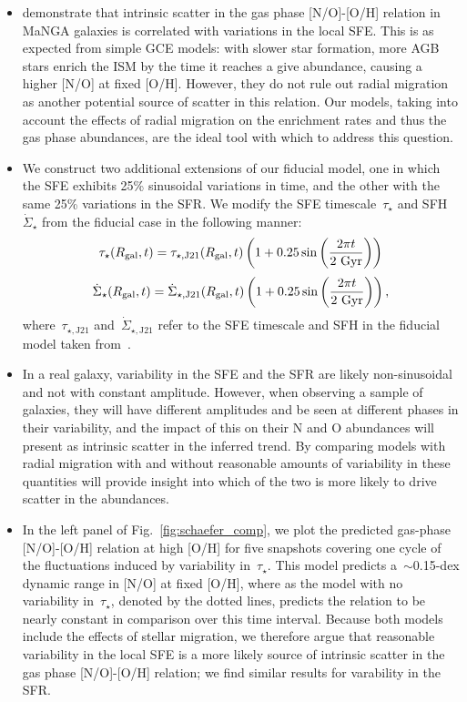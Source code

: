 \documentclass[ms.tex]{subfiles}
\begin{document}
\begin{itemize} 
	\item \citet{Schaefer2020} demonstrate that intrinsic scatter in the gas 
	phase [N/O]-[O/H] relation in MaNGA galaxies is correlated with variations 
	in the local SFE. 
	This is as expected from simple GCE models: with slower star formation, 
	more AGB stars enrich the ISM by the time it reaches a give abundance, 
	causing a higher [N/O] at fixed [O/H]. 
	However, they do not rule out radial migration as another potential source 
	of scatter in this relation. 
	Our models, taking into account the effects of radial migration on the 
	enrichment rates and thus the gas phase abundances, are the ideal tool 
	with which to address this question. 

	\item We construct two additional extensions of our fiducial model, one 
	in which the SFE exhibits 25\% sinusoidal variations in time, and the other 
	with the same 25\% variations in the SFR. 
	We modify the SFE timescale~$\tau_\star$ and SFH~$\dot{\Sigma}_\star$ from 
	the fiducial case in the following manner: 
	\begin{equation} 
	\tau_\star(R_\text{gal}, t) = \tau_{\star,\text{J21}}(R_\text{gal}, t)\left(1 + 0.25\sin 
	\left(\frac{2\pi t}{2\text{ Gyr}}\right)\right)
	\end{equation} 
	\begin{equation} 
	\dot{\Sigma}_\star(R_\text{gal}, t) = \dot{\Sigma}_{\star,\text{J21}}(R_\text{gal}, t) 
	\left(1 + 0.25\sin \left(\frac{2\pi t}{2\text{ Gyr}}\right)\right), 
	\end{equation} 
	where~$\tau_{\star,\text{J21}}$ and~$\dot{\Sigma}_{\star,\text{J21}}$ refer 
	to the SFE timescale and SFH in the fiducial model taken 
	from~\citet{Johnson2021}. 

	\item In a real galaxy, variability in the SFE and the SFR are likely 
	non-sinusoidal and not with constant amplitude. 
	However, when observing a sample of galaxies, they will have different 
	amplitudes and be seen at different phases in their variability, and the 
	impact of this on their N and O abundances will present as intrinsic 
	scatter in the inferred trend. 
	By comparing models with radial migration with and without reasonable 
	amounts of variability in these quantities will provide insight into which 
	of the two is more likely to drive scatter in the abundances. 

	\item In the left panel of Fig.~\ref{fig:schaefer_comp}, we plot the 
	predicted gas-phase [N/O]-[O/H] relation at high [O/H] for five snapshots 
	covering one cycle of the fluctuations induced by variability 
	in~$\tau_\star$. 
	This model predicts a~$\sim$0.15-dex dynamic range in [N/O] at fixed [O/H], 
	where as the model with no variability in~$\tau_\star$, denoted by the 
	dotted lines, predicts the relation to be nearly constant in comparison 
	over this time interval. 
	Because both models include the effects of stellar migration, we therefore 
	argue that reasonable variability in the local SFE is a more likely source 
	of intrinsic scatter in the gas phase [N/O]-[O/H] relation; we find 
	similar results for varability in the SFR. 


\end{itemize}
\end{document}
